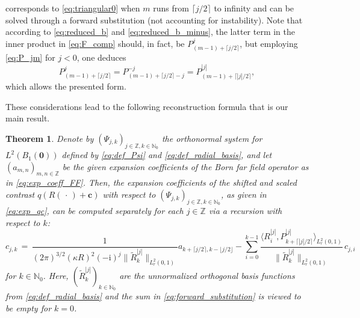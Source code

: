 \documentclass[11pt,a4paper]{article}
\newtheorem{theorem}{Theorem}[section]
\theoremstyle{definition}
\theoremstyle{remark} \newtheorem{remark}[theorem]{Remark}
\numberwithin{equation}{section}
\numberwithin{figure}{section}
\numberwithin{algorithm}{section}
\numberwithin{table}{section}
\newcommand{\field}[1]{{\mathbb{#1}}}
\newcommand{\N}{\field{N}}
\newcommand{\Z}{\field{Z}}
\newcommand{\bs}{\boldsymbol}
\newcommand{\bfc}{{\bs c}}
\newcommand{\bfzero}{{\bs 0}}
\newcommand{\rmi}{\mathrm{i}}
\newcommand{\ph}{\,\cdot\,}
\newcommand{\Ltwo}{{L^2}}
\begin{document}
corresponds to \eqref{eq:triangular0} when $m$ runs from $\lceil j/2\rceil$ to infinity and can be solved through a forward substitution (not accounting for instability).
Note that according to \eqref{eq:reduced_b} and \eqref{eq:reduced_b_minus}, the latter term in the inner product in \eqref{eq:F_comp} should, in fact, be $P_{(m-1)+\lceil j/2\rceil}^{j}$, but employing \eqref{eq:P_jm} for $j < 0$, one deduces
$$
P_{(m-1)+\lceil j/2\rceil}^{j} = P_{(m-1)+\lceil j/2\rceil - j }^{-j} = P_{(m-1) + \lceil |j|/2\rceil}^{|j|},
$$
which allows the presented form.

These considerations lead to the following reconstruction formula that is our main result.
%

\begin{theorem}
\label{Theorem:main}
Denote by $(\Psi_{j,k})_{j\in\Z,k\in\N_0}$ the orthonormal system for $\Ltwo(B_1(\bfzero))$ defined by \eqref{eq:def_Psi} and \eqref{eq:def_radial_basis}, and let $(a_{m,n})_{m,n\in\Z}$ be the given expansion coefficients of the Born far field operator as in \eqref{eq:exp_coeff_FF}.
Then, the expansion coefficients of the shifted and scaled contrast $q(R(\ph)+\bfc)$ with respect to $(\Psi_{j,k})_{j\in\Z,k\in\N_0}$, as given in \eqref{eq:exp_qc}, can be computed separately for each $j \in \Z$ via a recursion with respect to $k$:
\begin{equation}
\label{eq:forward_substitution}
	c_{j,k} \,=\, \frac 1 {(2\pi)^{3/2}(\kappa R)^2(-\rmi)^j \big\| \widetilde{R}_{k}^{|j|} \big \|_{L^2_r(0,1)}} a_{k+\lceil j/2\rceil, k-\lfloor j/2\rfloor} 
	- \sum_{i=0}^{k-1} \frac{\big \langle R_{i}^{|j|}, P_{k+\lceil |j|/2\rceil}^{|j|} \big \rangle_{L^2_r(0,1)}}{\big\| \widetilde{R}_{k}^{|j|} \big\|_{L^2_r(0,1)} } \, c_{j, i}
\end{equation}
for $k \in \N_0$. Here, $(\widetilde{R}_{k}^{|j|})_{k \in \N_0}$ are the unnormalized orthogonal basis functions from \eqref{eq:def_radial_basis} and the sum in \eqref{eq:forward_substitution} is viewed to be empty for $k=0$.
\end{theorem}
\end{document}
